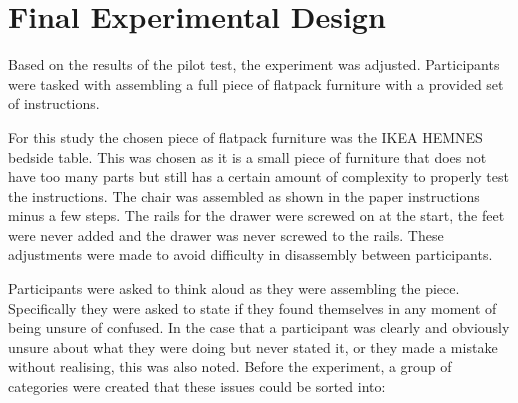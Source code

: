 \documentclass{l4proj}
\begin{document}
\section{Final Experimental Design}

Based on the results of the pilot test, the experiment was adjusted. Participants were tasked with assembling a full piece of flatpack furniture with a provided set of instructions. 

For this study the chosen piece of flatpack furniture was the IKEA HEMNES bedside table. This was chosen as it is a small piece of furniture that does not have too many parts but still has a certain amount of complexity to properly test the instructions. The chair was assembled as shown in the paper instructions minus a few steps. The rails for the drawer were screwed on at the start, the feet were never added and the drawer was never screwed to the rails. These adjustments were made to avoid difficulty in disassembly between participants.

Participants were asked to think aloud as they were assembling the piece. Specifically they were asked to state if they found themselves in any moment of being unsure of confused. In the case that a participant was clearly and obviously unsure about what they were doing but never stated it, or they made a mistake without realising, this was also noted. Before the experiment, a group of categories were created that these issues could be sorted into:
\end{document}
